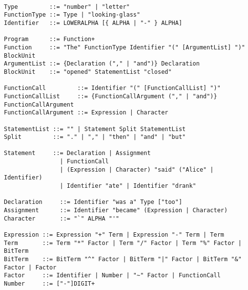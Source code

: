 \documentclass[a4wide, 11pt]{article}
\begin{document}
\begin{verbatim}

Type         ::= "number" | "letter"
FunctionType ::= Type | "looking-glass"
Identifier   ::= LOWERALPHA [{ ALPHA | "-" } ALPHA]

Program      ::= Function+
Function     ::= "The" FunctionType Identifier "(" [ArgumentList] ")" BlockUnit
ArgumentList ::= {Declaration ("," | "and")} Declaration
BlockUnit    ::= "opened" StatementList "closed"

FunctionCall         ::= Identifier "(" [FunctionCallList] ")"
FunctionCallList     ::= {FunctionCallArgument ("," | "and")} FunctionCallArgument
FunctionCallArgument ::= Expression | Character

StatementList ::= "" | Statement Split StatementList
Split         ::= "." | "," | "then" | "and" | "but"

Statement     ::= Declaration | Assignment
                | FunctionCall
                | (Expression | Character) "said" ("Alice" | Identifier)
                | Identifier "ate" | Identifier "drank"
               
Declaration     ::= Identifier "was a" Type ["too"]
Assignment      ::= Identifier "became" (Expression | Character)
Character       ::= "`" ALPHA "'"

Expression ::= Expression "+" Term | Expression "-" Term | Term
Term       ::= Term "*" Factor | Term "/" Factor | Term "%" Factor | BitTerm
BitTerm    ::= BitTerm "^" Factor | BitTerm "|" Factor | BitTerm "&" Factor | Factor
Factor     ::= Identifier | Number | "~" Factor | FunctionCall
Number     ::= ["-"]DIGIT+ 

\end{verbatim}
\end{document}
